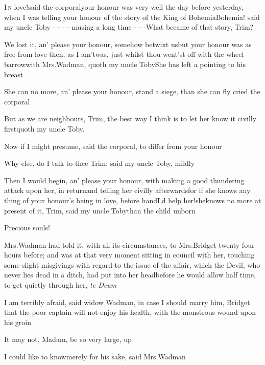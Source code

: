 \documentclass{article}
\begin{document}
\lettrine{I}{\,n} love!\tsh said the
corporal\tsk your honour was very well the day before yesterday,
when I was telling your honour of the story of the King of
Bohemia\break\null\tsk Bohemia! said my uncle Toby - - - -\break
musing a long time - - -\enspace What became of that story,
Trim?

\tsh We lost it, an’ please your honour, somehow betwixt
us\tsk but your honour was as free from love then, as I
am\tsh\break ’twas, just whilst thou went’st off with
the wheel-barrow\tsh with Mrs.\@ Wadman, quoth my
uncle Toby\tsh She has left a
 pointing to his breast\tsh

\tsh She can no more, an’ please your\break
honour, stand a siege, than she can fly\tsk\break
cried the corporal\tsh

\tsh But as we are neighbours, Trim,\break
\tsk the
best way I think is to let her know it civilly first\tsk quoth my
uncle Toby.

Now if I might presume, said the corporal, to differ from your
honour\tsh

\tsh Why else, do I talk to thee Trim: said my uncle
Toby, mildly\tsh

\tsh Then I would begin, an’ please your honour, with
making a good thundering attack upon her, in return\tsk and
telling her civilly afterwards\tsk for if she knows any thing of
your honour’s being in love, before
hand\tsh L\tsk d help her!\tsk she\break knows no more at
present of it, Trim, said my uncle Toby\tsk than
the child\break
unborn\tsh

Precious souls!\tsh

Mrs.\@ Wadman had told it, with all its circumstances, to
Mrs.\@ Bridget twenty-four hours before; and was at that very\break
moment sitting in council with her, touching some slight misgivings
with regard to the issue of the affair, which the Devil, who never
lies dead in a ditch, had put into her head\tsk before he would
allow half time, to get quietly through her, \textit{te Deum}\tsh

I am terribly afraid, said widow Wadman, in case I should
marry him, Bridget
\tsk that the poor captain will not enjoy his
health, with the monstrous wound upon his groin\tsh

It may not, Madam, be so very large, 
up\tsh

\tsh I could like to know\tsk merely for his sake,
said Mrs.\@ Wadman\tsh
\end{document}
